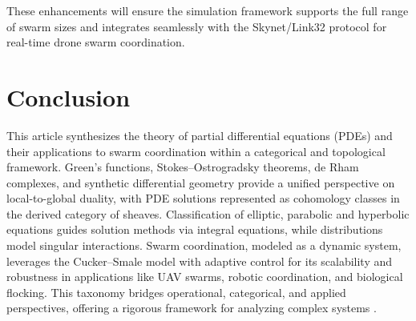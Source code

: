 \documentclass{article}
\theoremstyle{plain}
\begin{document}
These enhancements will ensure the simulation framework supports the full range of swarm sizes and integrates seamlessly with the Skynet/Link32 protocol for real-time drone swarm coordination.

\section{Conclusion}
This article synthesizes the theory of partial differential equations (PDEs)
and their applications to swarm coordination within a categorical and topological framework.
Green's functions, Stokes--Ostrogradsky theorems, de Rham complexes, and synthetic
differential geometry provide a unified perspective on local-to-global duality,
with PDE solutions represented as cohomology classes in the derived category of sheaves.
Classification of elliptic, parabolic and hyperbolic equations guides solution methods via
integral equations, while distributions model singular interactions. Swarm coordination,
modeled as a dynamic system, leverages the Cucker--Smale model with adaptive control for
its scalability and robustness in applications like UAV swarms, robotic coordination,
and biological flocking. This taxonomy bridges operational, categorical, and applied
perspectives, offering a rigorous framework for analyzing complex systems \cite{nLab_synthetic_diff_geom, nLab_de_Rham_theorem}.
\end{document}
